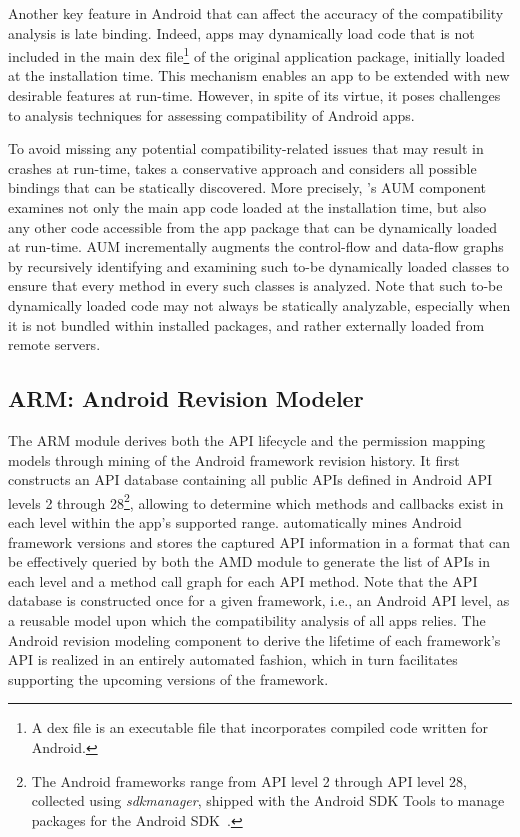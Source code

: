 Another key feature in Android that can affect the accuracy
of the compatibility analysis is late binding.  Indeed, apps
may dynamically load code that is not included in the main
dex file\footnote{A dex file is an executable file that
incorporates compiled code written for Android.} of the
original application package, initially loaded at the
installation time.  This mechanism enables an app to be
extended with new desirable features at run-time. However,
in spite of its virtue, it poses challenges to analysis
techniques for assessing compatibility of Android apps.

To avoid missing any potential compatibility-related issues
that may result in crashes at run-time, \@approach takes a
conservative approach and considers all possible bindings
that can be statically discovered.  More precisely,
\@approach's AUM component examines not only the main app
code loaded at the installation time, but also any other
code accessible from the app package that can be dynamically
loaded at run-time.  AUM incrementally augments the
control-flow and data-flow graphs by recursively identifying
and examining such to-be dynamically loaded classes to
ensure that every method in every such classes is analyzed.
Note that such to-be dynamically loaded code may not always
be statically analyzable, especially when it is not bundled
within installed packages, and rather externally loaded from
remote servers.
  
\subsection{ARM: Android Revision Modeler} 

The ARM module derives both the API lifecycle and the permission mapping models through mining of the Android framework revision history.
It first constructs an API database containing all public APIs defined in Android API levels 2 through 28\footnote{The Android frameworks range from API level 2 through API level 28, collected using {\it sdkmanager}, shipped with the Android SDK Tools to manage packages for the Android SDK~\cite{sdkmanager}. }, allowing \@approach to determine which methods and callbacks exist in each level within the app's supported range. \@approach automatically mines Android framework versions and stores the captured API information in a format that can be effectively queried by both the AMD module to generate the list of APIs in each level and a method call graph for each API method.
Note that the API database is constructed once for a given framework, i.e., an Android API level, as a reusable model upon which the compatibility analysis of all apps relies.
The Android revision modeling component to derive the lifetime of each framework's API is realized in an entirely automated fashion, which in turn facilitates supporting the upcoming versions of the framework. %




